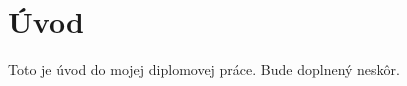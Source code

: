 \cleardoublepage
{}
\chapter*{Úvod}\label{chap:intro}

Toto je úvod do mojej diplomovej práce. Bude doplnený neskôr.

\begin{comment}
Ukážka nášho softvéru \emph{Gnarley Trees} je na obrázku~\ref{img:historia}.
Tento projekt začal ako bakalárska práca Jakuba Kováča \citep{kuko};
v tejto práci popisujeme nové dátové štruktúry, ktoré sme vizualizovali
a nové funkcie a vylepšenia, ktoré sme doplnili. Konkrétne ide o 
\emph{union-find problém}, \emph{písmenkový strom (trie)} a 
\emph{sufixový strom}. 

Softvér v súčasnosti vyvíja okrem Kuba Kováča aj Katka Kotrlová, ktorá 
vizualizovala rôzne typy háld a intervalové stromy, Táňa Tóthová, ktorá 
vizualizovala \emph{finger tree} a \emph{B$^+$-strom}.
Okrem vizualizácie softvér prerábame a neustále vylepšujeme.
Pavol Lukča ho doplnil o históriu krokov a operácií. Softvér je celý v 
slovenčine aj angličtine a je 
implementovaný v jazyku \Java. Dostupný je na stránke
{\url{http://people.ksp.sk/~kuko/gnarley-trees}} vo forme appletov
s jednotlivými dátovými štruktúrami, a tiež vo forme samostatného programu,
ktorý obsahuje všetky dátové štruktúry a je určený na používanie offline.

Našou snahou je vytvoriť kvalitný softvér nezávislý od operačného systému, 
ktorý bude vyhovovať ako pomôcka pri výučbe ako aj pri samoštúdiu a bude
voľne prístupný. 

Predchádzajúci výskum v oblasti pedagogiky
zatiaľ nedokázal úplne preukázať pedagogickú efektívnosť
vizualizácií \citep{shaffer}, avšak viacero štúdií potvrdilo zvýšený záujem
a zapojenosť študentov \citep{naps02, hundhausen02}.

Rozmach vizualizácie algoritmov priniesla najmä \Java\ a jej fungovanie 
bez viazanosti na konkrétny operačný systém. Kvalita iných existujúcich 
vizualizácií sa líši a keďže ide o ľahko naprogramovateľné programy, je ich 
veľa a sú pomerne nekvalitné \citep{shaffer}. 
Zbieraním a analyzovaním kvality sa venuje skupina AlgoViz (\hbox{\url{http://algoviz.org/}}).

Zaujímavé je pozorovanie, že určovanie si vlastného tempa pri vizualizácií 
je veľká pomôcka. Naopak, ukazovanie pseudokódu alebo nemožnosť určenia si
vlastného tempa (napríklad animácia bez možnosti pozastavenia), takmer 
žiadne zlepšenie neprináša \citep{shaffer,saraiya}.


\end{comment}
